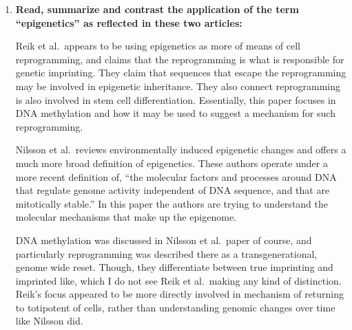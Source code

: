 \documentclass[basic]{inVerba-notes}
\begin{document}
\begin{enumerate}
    \item \textbf{Read, summarize and contrast the application of the term “epigenetics” as reflected in these two articles:}
    

    Reik et al.\ appears to be using epigenetics as more of means of cell reprogramming, and claims that the reprogramming is what is responsible for genetic imprinting. They claim that sequences that escape the reprogramming may be involved in epigenetic inheritance. They also connect reprogramming is also involved in stem cell differentiation. Essentially, this paper focuses in DNA methylation and how it may be used to suggest a mechanism for such reprogramming. 

    Nilsson et al.\ reviews environmentally induced epigenetic changes and offers a much more broad definition of epigenetics. These authors operate under a more recent definition of, ``the molecular factors and processes around DNA that regulate genome activity independent of DNA sequence, and that are mitotically stable.'' In this paper the authors are trying to understand the molecular mechanisms that make up the epigenome.

    DNA methylation was discussed in Nilsson et al.\ paper of course, and particularly reprogramming was described there as a transgenerational, genome wide reset. Though, they differentiate between true imprinting and imprinted like, which I do not see Reik et al.\ making any kind of distinction. Reik's focus appeared to be more directly involved in mechanism of returning to totipotent of cells, rather than understanding genomic changes over time like Nilsson did. 




  \end{enumerate}
\end{document}
